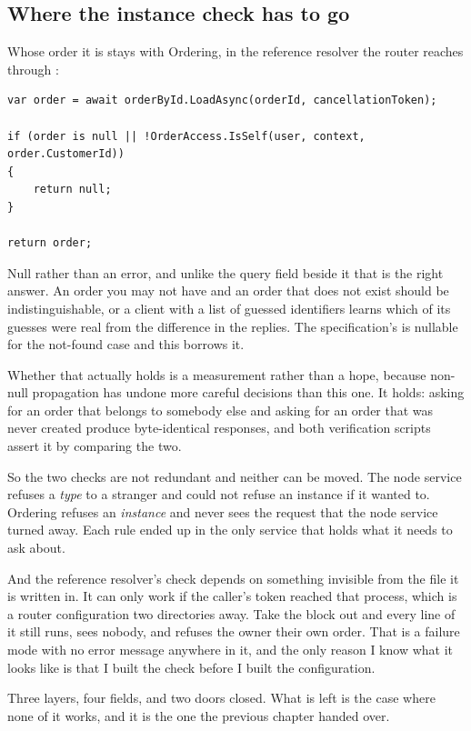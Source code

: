 \subsection*{Where the instance check has to go}

%
Whose order it is stays with Ordering, in the reference resolver the router
reaches through :

\begin{verbatim}
var order = await orderById.LoadAsync(orderId, cancellationToken);

if (order is null || !OrderAccess.IsSelf(user, context, order.CustomerId))
{
    return null;
}

return order;
\end{verbatim}

Null rather than an error, and unlike the query field beside it that is the
right answer. An order you may not have and an order that does not exist should
be indistinguishable, or a client with a list of guessed identifiers learns
which of its guesses were real from the difference in the replies. The
specification's \code{[\_Entity]} is nullable for the not-found case and this
borrows it.

Whether that actually holds is a measurement rather than a hope, because
non-null propagation has undone more careful decisions than this one. It holds:
asking for an order that belongs to somebody else and asking for an order that
was never created produce byte-identical responses, and both verification
scripts assert it by comparing the two.

%
So the two checks are not redundant and neither can be moved. The node service
refuses a \emph{type} to a stranger and could not refuse an instance if it
wanted to. Ordering refuses an \emph{instance} and never sees the request that
the node service turned away. Each rule ended up in the only service that holds
what it needs to ask about.

%
And the reference resolver's check depends on something invisible from the file
it is written in. It can only work if the caller's token reached that process,
which is a router configuration two directories away. Take the 
block out and every line of it still runs, sees nobody, and refuses the owner
their own order. That is a failure mode with no error message anywhere in it,
and the only reason I know what it looks like is that I built the check before I
built the configuration.

\medskip
Three layers, four fields, and two doors closed. What is left is the case where
none of it works, and it is the one the previous chapter handed over.

%
